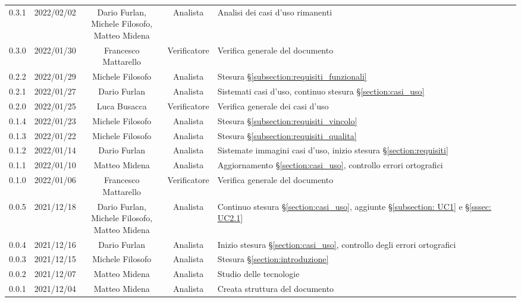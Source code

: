 \begin{center}
\begin{longtable}[c]{c | c | c | c | p{5cm}}
		0.3.1 & 2022/02/02 & \Shortunderstack{Dario Furlan,\\Michele Filosofo,\\Matteo Midena\\} & Analista & Analisi dei casi d'uso rimanenti \\
		0.3.0 & 2022/01/30 & Francesco Mattarello & Verificatore & Verifica generale del documento\\
		0.2.2 & 2022/01/29 & Michele Filosofo & Analista & Stesura §\ref{subsection:requisiti_funzionali}\\
		0.2.1 & 2022/01/27 & Dario Furlan & Analista & Sistemati casi d'uso, continuo stesura §\ref{section:casi_uso}\\
		0.2.0 & 2022/01/25 & Luca Busacca & Verificatore & Verifica generale dei casi d'uso\\
		0.1.4 & 2022/01/23 & Michele Filosofo & Analista & Stesura §\ref{subsection:requisiti_vincolo}\\
		0.1.3 & 2022/01/22 & Michele Filosofo & Analista & Stesura §\ref{subsection:requisiti_qualita}\\
		0.1.2 & 2022/01/14 & Dario Furlan & Analista & Sistemate immagini casi d'uso, inizio stesura §\ref{section:requisiti}\\
		0.1.1 & 2022/01/10 & Matteo Midena & Analista & Aggiornamento §\ref{section:casi_uso}, controllo errori ortografici\\
		0.1.0 & 2022/01/06 & Francesco Mattarello & Verificatore & Verifica generale del documento\\
		0.0.5 & 2021/12/18 & \Shortunderstack{Dario Furlan,\\Michele Filosofo,\\Matteo Midena\\} & Analista & Continuo stesura §\ref{section:casi_uso}, aggiunte §\ref{subsection: UC1} e §\ref{sssec: UC2.1}\\
		0.0.4 & 2021/12/16 & Dario Furlan & Analista & Inizio stesura §\ref{section:casi_uso}, controllo degli errori ortografici\\
		0.0.3 & 2021/12/15 & Michele Filosofo & Analista & Stesura §\ref{section:introduzione}\\
		0.0.2 & 2021/12/07 & Matteo Midena & Analista & Studio delle tecnologie\\
		0.0.1 & 2021/12/04 & Matteo Midena & Analista & Creata struttura del documento\\
	\end{longtable}
\end{center}